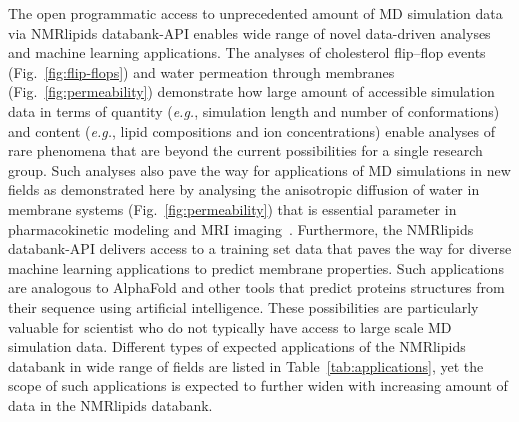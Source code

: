 \documentclass[fleqn,10pt]{wlscirep}
\begin{document}
The open programmatic access to unprecedented amount of MD simulation data via NMRlipids databank-API enables wide range of novel data-driven analyses and machine learning applications. The analyses of cholesterol flip--flop events (Fig.~\ref{fig:flip-flops}) and water permeation through membranes (Fig.~\ref{fig:permeability}) demonstrate how large amount of accessible simulation data in terms of quantity (\textit{e.g.}, simulation length and number of conformations) and content (\textit{e.g.}, lipid compositions and ion concentrations) enable analyses of rare phenomena that are beyond the current possibilities for a single research group. Such analyses also pave the way for applications of MD simulations in new fields as demonstrated here by analysing the anisotropic diffusion of water in membrane systems (Fig.~\ref{fig:permeability}) that is essential parameter in pharmacokinetic modeling and MRI imaging~\cite{nitsche19,topgaard20}. Furthermore, the NMRlipids databank-API delivers access to a training set data that paves the way for diverse machine learning applications to 
predict membrane properties. Such applications are analogous to AlphaFold \cite{jumper21} and other tools that predict proteins structures from their sequence using artificial intelligence. These possibilities are particularly valuable for scientist who do not typically have access to large scale MD simulation data.
%
%
Different types of expected applications of the NMRlipids databank in wide range of fields are listed in Table~\ref{tab:applications}, yet the scope of such applications
is expected to further widen with increasing amount of data in the NMRlipids databank.  
\end{document}
